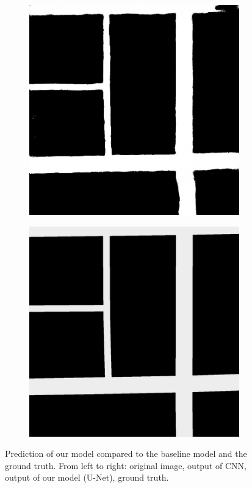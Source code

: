 \documentclass[10pt,conference,compsocconf]{IEEEtran}
\begin{document}
\begin{figure}[ht]
\begin{subfigure}{0.20\linewidth}
    \end{subfigure}
    \begin{subfigure}{0.20\linewidth}
        \centering
        \includegraphics[width=0.9\linewidth]{doc/images/perfect_unet.png}
    \end{subfigure}
    \begin{subfigure}{0.20\linewidth}
        \centering
        \includegraphics[width=0.9\linewidth]{doc/images/perfect_gt.png}
    \end{subfigure}
    \caption{Prediction of our model compared to the baseline model and the ground truth. From left to right: original image, output of CNN, output of our model (U-Net), ground truth.}
    \label{fig:output_comparison}
\end{figure}
\end{document}
